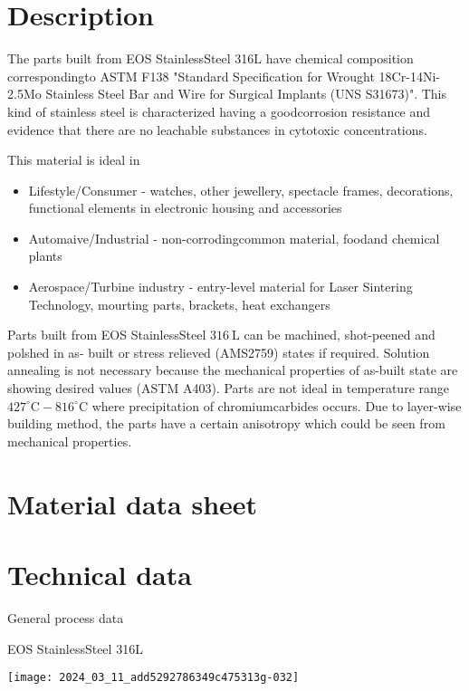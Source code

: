 \documentclass[10pt]{article}
\begin{document}
\section*{Description}
The parts built from EOS StainlessSteel 316L have chemical composition correspondingto ASTM F138 "Standard Specification for Wrought 18Cr-14Ni-2.5Mo Stainless Steel Bar and Wire for Surgical Implants (UNS S31673)". This kind of stainless steel is characterized having a goodcorrosion resistance and evidence that there are no leachable substances in cytotoxic concentrations.

This material is ideal in

\begin{itemize}
  \item Lifestyle/Consumer - watches, other jewellery, spectacle frames, decorations, functional elements in electronic housing and accessories
  \item Automaive/Industrial - non-corrodingcommon material, foodand chemical plants
  \item Aerospace/Turbine industry - entry-level material for Laser Sintering Technology, mourting parts, brackets, heat exchangers
\end{itemize}

Parts built from EOS StainlessSteel $316 \mathrm{~L}$ can be machined, shot-peened and polshed in as- built or stress relieved (AMS2759) states if required. Solution annealing is not necessary because the mechanical properties of as-built state are showing desired values (ASTM A403). Parts are not ideal in temperature range $427^{\circ} \mathrm{C}-816^{\circ} \mathrm{C}$ where precipitation of chromiumcarbides occurs. Due to layer-wise building method, the parts have a certain anisotropy which could be seen from mechanical properties.

\section*{Material data sheet}
\section*{Technical data}
General process data

EOS StainlessSteel 316L

\begin{center}
\texttt{[image: 2024\_03\_11\_add5292786349c475313g-032]}
\end{center}
\end{document}
